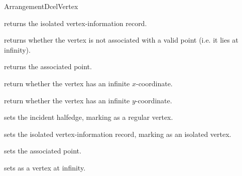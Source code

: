 \begin{ccRefConcept}{ArrangementDcelVertex}
{
    {returns the isolated vertex-information record.
     }

    {returns whether the vertex is not associated with a valid point (i.e. it
     lies at infinity).}

    {returns the associated point.
     }

    {return whether the vertex has an infinite $x$-coordinate.}

    {return whether the vertex has an infinite $y$-coordinate.}

\ccModifiers

    {sets the incident halfedge, marking \ccVar{} as a regular vertex.}

    {sets the isolated vertex-information record, marking \ccVar{}
     as an isolated vertex.}

    {sets the associated point.}

    {sets \ccVar{} as a vertex at infinity.
     }

} %

\ccSeeAlso

\\
\\

\end{ccRefConcept}  

\ccRefPageEnd

